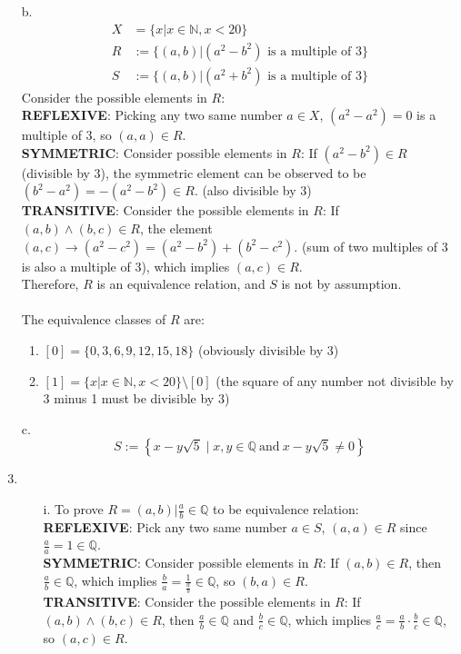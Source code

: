 \documentclass{article}
\begin{document}
\begin{enumerate}
    \item [b.] \[\begin{aligned}
                  X & = \{x | x \in \mathbb{N}, x < 20\}              \\
                  R & :=\{(a,b)|(a^2-b^2)\text{ is a multiple of 3}\} \\
                  S & :=\{(a,b)|(a^2+b^2)\text{ is a multiple of 3}\}
              \end{aligned}
          \]
          Consider the possible elements in $R$:\\
          \textbf{REFLEXIVE}: Picking any two same number $a \in X$, $(a^2-a^2)=0$ is a multiple of 3, so $(a,a) \in R$.\\
          \textbf{SYMMETRIC}: Consider possible elements in $R$: If $(a^2-b^2)\in R$ (divisible by 3), the symmetric element can be observed to be $(b^2-a^2)=-(a^2-b^2)\in R$. (also divisible by 3)\\
          \textbf{TRANSITIVE}: Consider the possible elements in $R$: If $(a,b) \land (b,c) \in R$, the element $(a,c) \to (a^2-c^2)=(a^2-b^2)+(b^2-c^2)$. (sum of two multiples of 3 is also a multiple of 3), which implies $(a,c) \in R$.\\
          Therefore, $R$ is an equivalence relation, and $S$ is not by assumption.\\
          \\
          The equivalence classes of $R$ are:
          \begin{enumerate}
              \item $[0] = \{0,3,6,9,12,15,18\}$ (obviously divisible by 3)
              \item $[1] = \{x | x \in \mathbb{N}, x < 20\} \setminus [0]$ (the square of any number not divisible by 3 minus 1 must be divisible by 3)
          \end{enumerate}

    \item [c.] \[S:=\left\{x-y\sqrt{5}\mid x,y\in\mathbb{Q}\mathrm{~and~}x-y\sqrt{5}\neq0\right\}\]
    \item \begin{enumerate}
              \item [i.] To prove $R = {(a,b) | \frac{a}{b} \in \mathbb{Q}}$ to be equivalence relation:\\
                    \textbf{REFLEXIVE}: Pick any two same number $a \in S$, $(a,a) \in R$ since $\frac{a}{a}=1 \in \mathbb{Q}$.\\
                    \textbf{SYMMETRIC}: Consider possible elements in $R$: If $(a,b) \in R$, then $\frac{a}{b} \in \mathbb{Q}$, which implies $\frac{b}{a}=\frac{1}{\frac{a}{b}} \in \mathbb{Q}$, so $(b,a) \in R$.\\
                    \textbf{TRANSITIVE}: Consider the possible elements in $R$: If $(a,b) \land (b,c) \in R$, then $\frac{a}{b} \in \mathbb{Q}$ and $\frac{b}{c} \in \mathbb{Q}$, which implies $\frac{a}{c}=\frac{a}{b}\cdot\frac{b}{c} \in \mathbb{Q}$, so $(a,c) \in R$.\\


\end{enumerate}
\end{enumerate}
\end{document}
